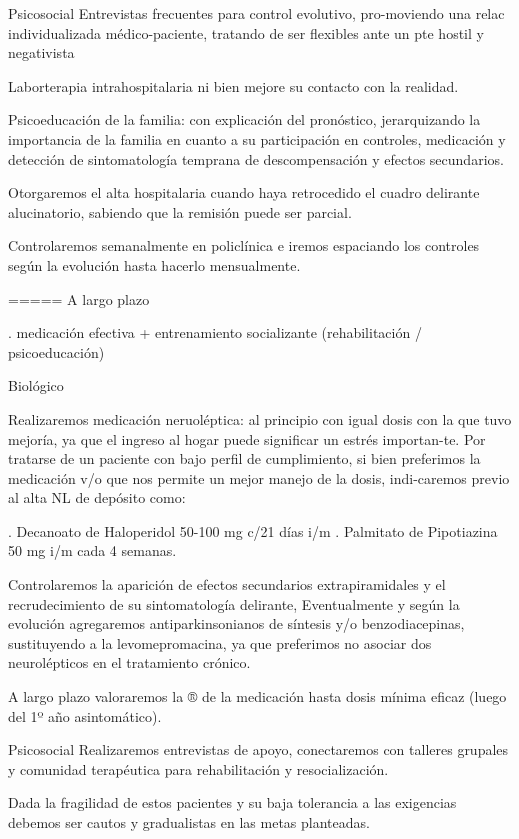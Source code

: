 \documentclass{scrbook}
\begin{document}
Psicosocial Entrevistas frecuentes para control evolutivo, pro-moviendo una relac individualizada médico-paciente, tratando de ser flexibles ante un pte hostil y negativista

Laborterapia intrahospitalaria ni bien mejore su contacto con la realidad.

Psicoeducación de la familia: con explicación del pronóstico, jerarquizando la importancia de la familia en cuanto a su participación en controles, medicación y detección de sintomatología temprana de descompensación y efectos secundarios.

Otorgaremos el alta hospitalaria cuando haya retrocedido el cuadro delirante alucinatorio, sabiendo que la remisión puede ser parcial.

Controlaremos semanalmente en policlínica e iremos espaciando los controles según la evolución hasta hacerlo mensualmente.

===== A largo plazo

. medicación efectiva + entrenamiento socializante (rehabilitación / psicoeducación)

Biológico

Realizaremos medicación neruoléptica: al principio con igual dosis con la que tuvo mejoría, ya que el ingreso al hogar puede significar un estrés importan-te. Por tratarse de un paciente con bajo perfil de cumplimiento, si bien preferimos la medicación v/o que nos permite un mejor manejo de la dosis, indi-caremos previo al alta NL de depósito como:

. Decanoato de Haloperidol 50-100 mg c/21 días i/m
. Palmitato de Pipotiazina 50 mg i/m cada 4 semanas.

Controlaremos la aparición de efectos secundarios extrapiramidales y el recrudecimiento de su sintomatología delirante, Eventualmente y según la evolución agregaremos antiparkinsonianos de síntesis y/o benzodiacepinas, sustituyendo a la levomepromacina, ya que preferimos no asociar dos neurolépticos en el tratamiento crónico.

A largo plazo valoraremos la ® de la medicación hasta dosis mínima eficaz (luego del 1º año asintomático).

Psicosocial Realizaremos entrevistas de apoyo, conectaremos con talleres grupales y comunidad terapéutica para rehabilitación y resocialización.

Dada la fragilidad de estos pacientes y su baja tolerancia a las exigencias debemos ser cautos y gradualistas en las metas planteadas.
\end{document}
